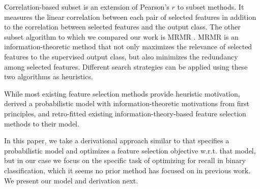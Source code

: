Correlation-based subset \cite{Hall1998} is an extension
of Pearson's $r$ to subset methods. It measures the linear correlation
between each pair of selected features in addition to the correlation
between selected features and the output class. The other subset
algorithm to which we compared our work is MRMR \cite{peng2005}.
MRMR is an information-theoretic method that not only maximizes
the relevance of selected features to the supervised output class,
but also minimizes the redundancy among selected features. Different
search strategies can be applied using these two algorithms as
heuristics.

While most existing feature selection methods provide heuristic
motivation,   \citeauthor{brown2012conditional} 
 derived a
probabilistic model with information-theoretic motivations from first
principles, and retro-fitted existing information-theory-based feature
selection methods to their model.

In this paper, we take a derivational approach similar to \citeauthor{brown2012conditional} 
that specifies a probabilistic model and optimizes a feature selection
objective w.r.t. that model, but in our case we focus on the specific
task of optimizing for recall in binary classification, which it 
seems no prior method has focused on in previous work.  We present
our model and derivation next.


